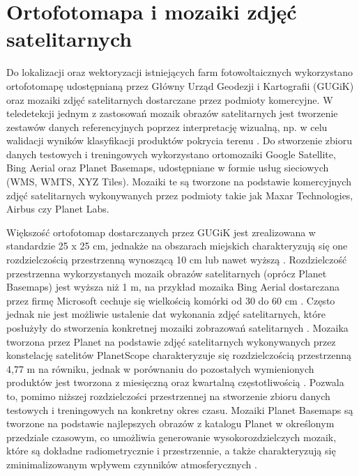 \documentclass{amuthesis}
\begin{document}
\hypertarget{sec-mosaics}{%
\section{Ortofotomapa i mozaiki zdjęć satelitarnych}\label{sec-mosaics}}

Do lokalizacji oraz wektoryzacji istniejących farm fotowoltaicznych
wykorzystano ortofotomapę udostępnianą przez Główny Urząd Geodezji i
Kartografii (GUGiK) oraz mozaiki zdjęć satelitarnych dostarczane przez
podmioty komercyjne. W teledetekcji jednym z zastosowań mozaik obrazów
satelitarnych jest tworzenie zestawów danych referencyjnych poprzez
interpretację wizualną, np. w celu walidacji wyników klasyfikacji
produktów pokrycia terenu \autocite{lesiv_2018_sat_imagery_mosaics}. Do
stworzenie zbioru danych testowych i treningowych wykorzystano
ortomozaiki Google Satellite, Bing Aerial oraz Planet Basemaps,
udostępniane w formie usług sieciowych (WMS, WMTS, XYZ Tiles). Mozaiki
te są tworzone na podstawie komercyjnych zdjęć satelitarnych
wykonywanych przez podmioty takie jak Maxar Technologies, Airbus czy
Planet Labs.

Większość ortofotomap dostarczanych przez GUGiK jest zrealizowana w
standardzie 25 x 25 cm, jednakże na obszarach miejskich charakteryzują
się one rozdzielczością przestrzenną wynoszącą 10 cm lub nawet wyższą
\autocite{ortofotomapa}. Rozdzielczość przestrzenna wykorzystanych
mozaik obrazów satelitarnych (oprócz Planet Basemaps) jest wyższa niż 1
m, na przykład mozaika Bing Aerial dostarczana przez firmę Microsoft
cechuje się wielkością komórki od 30 do 60 cm \autocite{bing_aerial}.
Często jednak nie jest możliwie ustalenie dat wykonania zdjęć
satelitarnych, które posłużyły do stworzenia konkretnej mozaiki
zobrazowań satelitarnych \autocite{lesiv_2018_sat_imagery_mosaics}.
Mozaika tworzona przez Planet na podstawie zdjęć satelitarnych
wykonywanych przez konstelację satelitów PlanetScope charakteryzuje się
rozdzielczością przestrzenną 4,77 m na równiku, jednak w porównaniu do
pozostałych wymienionych produktów jest tworzona z miesięczną oraz
kwartalną częstotliwością \autocite{planet_2019_basemaps}. Pozwala to,
pomimo niższej rozdzielczości przestrzennej na stworzenie zbioru danych
testowych i treningowych na konkretny okres czasu. Mozaiki Planet
Basemaps są tworzone na podstawie najlepszych obrazów z katalogu Planet
w określonym przedziale czasowym, co umożliwia generowanie
wysokorozdzielczych mozaik, które są dokładne radiometrycznie i
przestrzennie, a także charakteryzują się zminimalizowanym wpływem
czynników atmosferycznych \autocite{planet_2019_basemaps}.
\end{document}
